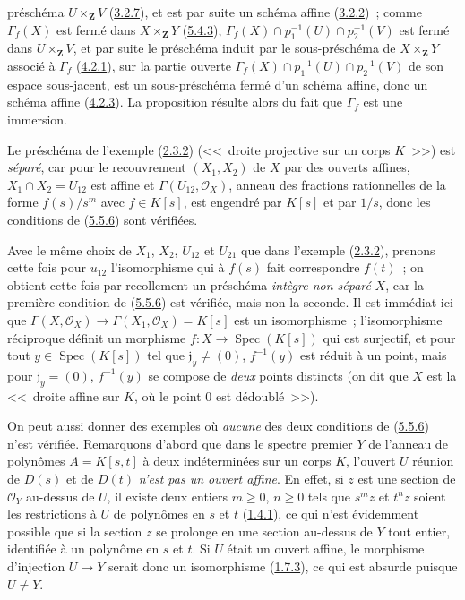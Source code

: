 préschéma $U\times_{\mathbf{Z}}V$
(\hyperref[I.3.2.7-fr]{3.2.7}), et est par suite un schéma affine
(\hyperref[I.3.2.2-fr]{3.2.2})~; comme $\Gamma_f(X)$ est fermé dans
$X\times_{\mathbf{Z}}Y$ (\hyperref[I.5.4.3-fr]{5.4.3}),
$\Gamma_f(X)\cap p_1^{-1}(U)\cap p_2^{-1}(V)$ est fermé dans
$U\times_{\mathbf{Z}}V$, et par suite le préschéma induit par le
sous-préschéma de $X\times_{\mathbf{Z}}Y$ associé à $\Gamma_f$
(\hyperref[I.4.2.1-fr]{4.2.1}), sur la partie ouverte
$\Gamma_f(X)\cap p_1^{-1}(U)\cap p_2^{-1}(V)$ de son espace sous-jacent, est
un sous-préschéma fermé d'un schéma affine, donc un schéma affine
(\hyperref[I.4.2.3-fr]{4.2.3}). La proposition résulte alors du fait que
$\Gamma_f$ est une immersion.

\begin{examples}[5.5.11]
\label{I.5.5.11-fr}
Le préschéma de l'exemple (\hyperref[I.2.3.2-fr]{2.3.2})
(<<~droite projective sur un corps $K$~>>) est \emph{séparé}, car pour le
recouvrement $(X_1,X_2)$ de $X$ par des ouverts affines,
$X_1\cap X_2=U_{12}$ est affine et $\Gamma(U_{12},\mathscr{O}_X)$, anneau des
fractions rationnelles de la forme $f(s)/s^m$ avec $f\in K[s]$, est engendré
par $K[s]$ et par $1/s$, donc les conditions de
(\hyperref[I.5.5.6-fr]{5.5.6}) sont vérifiées.

Avec le même choix de $X_1$, $X_2$, $U_{12}$ et $U_{21}$ que dans l'exemple
(\hyperref[I.2.3.2-fr]{2.3.2}), prenons cette fois pour $u_{12}$
l'isomorphisme qui à $f(s)$ fait correspondre $f(t)$~; on obtient cette fois
par recollement un préschéma \emph{intègre non séparé} $X$, car la première
condition de (\hyperref[I.5.5.6-fr]{5.5.6}) est vérifiée, mais non la seconde.
Il est immédiat ici que
$\Gamma(X,\mathscr{O}_X)\to\Gamma(X_1,\mathscr{O}_X)=K[s]$ est un
isomorphisme~; l'isomorphisme réciproque définit un morphisme
$f:X\to\operatorname{Spec}(K[s])$ qui est surjectif, et pour tout
$y\in\operatorname{Spec}(K[s])$ tel que $\mathfrak{j}_y\neq(0)$,
$f^{-1}(y)$ est réduit à un point, mais pour $\mathfrak{j}_y=(0)$,
$f^{-1}(y)$ se compose de \emph{deux} points distincts (on dit que $X$ est la
<<~droite affine sur $K$, où le point $0$ est dédoublé~>>).

On peut aussi donner des exemples où \emph{aucune} des deux conditions de
(\hyperref[I.5.5.6-fr]{5.5.6}) n'est vérifiée. Remarquons d'abord que dans le
spectre premier $Y$ de l'anneau de polynômes $A=K[s,t]$ à deux indéterminées
sur un corps $K$, l'ouvert $U$ réunion de $D(s)$ et de $D(t)$ \emph{n'est pas
un ouvert affine}. En effet, si $z$ est une section de $\mathscr{O}_Y$
au-dessus de $U$, il existe deux entiers $m\geq0$, $n\geq0$ tels que $s^m z$
et $t^n z$ soient les restrictions à $U$ de polynômes en $s$ et $t$
(\hyperref[I.1.4.1-fr]{1.4.1}), ce qui n'est évidemment possible que si la
section $z$ se prolonge en une section au-dessus de $Y$ tout entier,
identifiée à un polynôme en $s$ et $t$. Si $U$ était un ouvert affine, le
morphisme d'injection $U\to Y$ serait donc un isomorphisme
(\hyperref[I.1.7.3-fr]{1.7.3}), ce qui est absurde puisque $U\neq Y$.


\end{examples}
